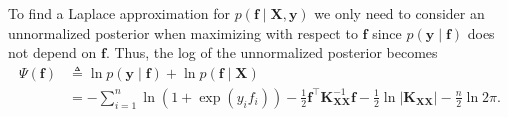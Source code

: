 To find a Laplace approximation for $p \left( \bm{f} \mid \bm{X} , \bm{y} \right)$ we only need to consider an unnormalized posterior when maximizing with respect to $\bm{f}$ since $p \left( \bm{y} \mid \bm{f} \right)$ does not depend on $\bm{f}$. Thus, the log of the unnormalized posterior becomes
\begin{align*}
    \Psi \left( \bm{f} \right)
     & \triangleq \ln p \left( \bm{y} \mid \bm{f} \right) + \ln p \left( \bm{f} \mid \bm{X} \right)                                                                                                                                \\
     & = - \sum_{i=1}^{n} \ln \left( 1 + \exp \left( y_i f_i \right) \right) - \frac{1}{2} \bm{f}^{\intercal} \bm{K}_{\bm{X} \bm{X}}^{-1} \bm{f} - \frac{1}{2} \ln \left| \bm{K}_{\bm{X} \bm{X}} \right| - \frac{n}{2} \ln 2 \pi .
\end{align*}